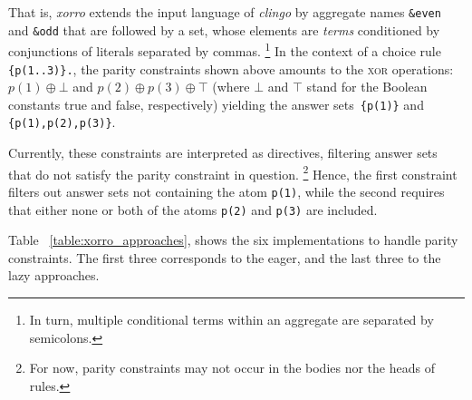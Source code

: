 \documentclass{article}
\newcommand{\XOR}{\textsc{xor}} %
\newcommand{\sysfont}{\textit}
\newcommand{\clingo}{\sysfont{clingo}}
\newcommand{\xorro}{\sysfont{xorro}}
\newcommand{\xor}{\oplus}
\newcommand{\set}[1]{\{#1\}}
\begin{document}
%
That is, \xorro{} extends the input language of \clingo{} by
aggregate names \texttt{\&even} and \texttt{\&odd} that are followed
by a set, whose elements are \emph{terms} conditioned by
conjunctions of literals separated by commas.%
%
\footnote{In turn, multiple conditional terms within an aggregate are
	separated by semicolons.}
%
In the context of a choice rule \texttt{\set{p(1..3)}.}, the parity constraints shown above
amounts to the \XOR{} operations: \\
$p(1) \xor \bot$ and $p(2) \xor p(3) \xor \top$
(where $\bot$ and $\top$ stand for the Boolean constants true and false, respectively)
yielding the answer sets~\texttt{\set{p(1)}} and \texttt{\set{p(1),p(2),p(3)}}.


Currently, these constraints are interpreted as directives,
filtering answer sets that do not satisfy the parity constraint in question.
\footnote{For now, parity constraints may not occur in the bodies nor the heads of rules.}
%
Hence, the first
constraint filters out answer sets not containing the atom
\texttt{p(1)}, while the second requires that either none or both of
the atoms \texttt{p(2)} and \texttt{p(3)} are included.

Table~ \ref{table:xorro_approaches}, shows the six implementations to handle parity constraints.
The first three corresponds to the eager, and the last three to the lazy approaches. 
\end{document}
